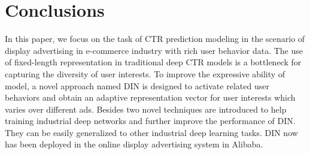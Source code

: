 \section{Conclusions}
In this paper, we focus on the task of CTR prediction modeling in the scenario of display advertising in e-commerce industry with rich user behavior data.
The use of fixed-length representation in traditional deep CTR models is a bottleneck for capturing the diversity of user interests. 
To improve the expressive ability of model, a novel approach named DIN is designed to activate related user behaviors and obtain an adaptive representation vector for user interests which varies over different ads.    
Besides two novel techniques are introduced to help training industrial deep networks and further improve the performance of DIN. They can be easily generalized to other industrial deep learning tasks. 
DIN now has been deployed in the online display advertising system in Alibaba.  

